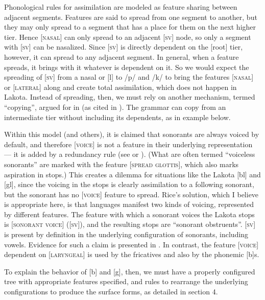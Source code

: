 \documentclass[output=paper]{LSP/langsci}
\begin{document}
Phonological rules for assimilation are modeled as feature sharing between adjacent segments. Features are said to spread from one segment to another, but they may only spread to a segment that has a place for them on the next higher tier. Hence [\textsc{nasal}] can only spread to an adjacent [\textsc{sv}] node, so only a segment with [\textsc{sv}] can be nasalized. Since [\textsc{sv}] is directly dependent on the [root] tier, however, it can spread to any adjacent segment. In general, when a feature spreads, it brings with it whatever is dependent on it. So we would expect the spreading of [\textsc{sv}] from a nasal or [l] to /p/ and /k/ to bring the features [\textsc{nasal}] or [\textsc{lateral}] along and create total assimilation, which does not happen in Lakota. Instead of spreading, then, we must rely on another mechanism, termed ``copying'', argued for in \citet{RiceAvery1991} (as cited in \citealt[316]{Rice1993}). The grammar can copy from an intermediate tier without including its dependents, as in example  below.

Within this model (and others), it is claimed that sonorants are always voiced by default, and therefore [\textsc{voice}] is not a feature in their underlying representation --- it is added by a redundancy rule (see \citealt[175, 177]{Botma2011} or \citealt[105]{Szigetvari2008}). (What are often termed ``voiceless sonorants'' are marked with the feature [\textsc{spread glottis}], which also marks aspiration in stops.) This creates a dilemma for situations like the Lakota [bl] and [gl], since the voicing in the stops is clearly assimilation to a following sonorant, but the sonorant has no [\textsc{voice}] feature to spread. Rice's solution, which I believe is appropriate here, is that languages manifest two kinds of voicing, represented by different features. The feature with which a sonorant voices the Lakota stops is [\textsc{sonorant voice}] ([\textsc{sv}]), and the resulting stops are ``sonorant obstruents''. [\textsc{sv}] is present by definition in the underlying configuration of sonorants, including vowels. Evidence for such a claim is presented in \citet{Rice1993}. In contrast, the feature [\textsc{voice}] dependent on [\textsc{laryngeal}] is used by the fricatives and also by the phonemic [b]s.

To explain the behavior of [b] and [g], then, we must have a properly configured tree with appropriate features specified, and rules to rearrange the underlying configurations to produce the surface forms, as detailed in section 4.
\end{document}
